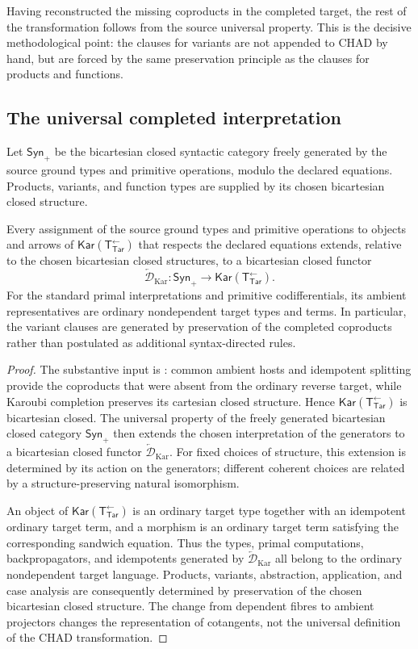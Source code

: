 \documentclass[runningheads,envcountsame]{llncs}
\newcommand{\Synp}{\mathsf{Syn}_{+}}
\newcommand{\Tar}{\mathsf{Tar}}
\newcommand{\TotTar}{\mathsf T_{\Tar}^{\leftarrow}}
\newcommand{\Kar}{\mathsf{Kar}}
\newcommand{\DKar}{\overleftarrow{\mathcal D}_{\mathrm{Kar}}}
\begin{document}
Having reconstructed the missing coproducts in the completed target, the rest of the transformation follows from the source universal property. This is the decisive methodological point: the clauses for variants are not appended to CHAD by hand, but are forced by the same preservation principle as the clauses for products and functions.

\subsection{The universal completed interpretation}

Let $\Synp$ be the bicartesian closed syntactic category freely generated by the source ground types and primitive operations, modulo the declared equations. Products, variants, and function types are supplied by its chosen bicartesian closed structure.

\begin{theorem}
\label{thm:semantic-kar}
Every assignment of the source ground types and primitive operations to objects and arrows of $\Kar(\TotTar)$ that respects the declared equations extends, relative to the chosen bicartesian closed structures, to a bicartesian closed functor
$$
\DKar:\Synp\longrightarrow\Kar(\TotTar).
$$
For the standard primal interpretations and primitive codifferentials, its ambient representatives are ordinary nondependent target types and terms. In particular, the variant clauses are generated by preservation of the completed coproducts rather than postulated as additional syntax-directed rules.
\end{theorem}

\begin{proof}
The substantive input is : common ambient hosts and idempotent splitting provide the coproducts that were absent from the ordinary reverse target, while Karoubi completion preserves its cartesian closed structure. Hence $\Kar(\TotTar)$ is bicartesian closed. The universal property of the freely generated bicartesian closed category $\Synp$ then extends the chosen interpretation of the generators to a bicartesian closed functor $\DKar$. For fixed choices of structure, this extension is determined by its action on the generators; different coherent choices are related by a structure-preserving natural isomorphism.

An object of $\Kar(\TotTar)$ is an ordinary target type together with an idempotent ordinary target term, and a morphism is an ordinary target term satisfying the corresponding sandwich equation. Thus the types, primal computations, backpropagators, and idempotents generated by $\DKar$ all belong to the ordinary nondependent target language. Products, variants, abstraction, application, and case analysis are consequently determined by preservation of the chosen bicartesian closed structure. The change from dependent fibres to ambient projectors changes the representation of cotangents, not the universal definition of the CHAD transformation.
\end{proof}
\end{document}
